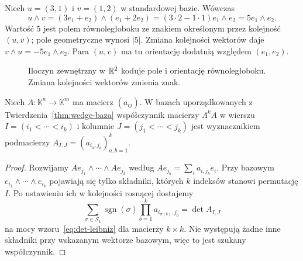\begin{przyklad}
Niech $u=(3,1)$ i $v=(1,2)$ w standardowej bazie.
Wówczas
\[
 u\wedge v=(3e_1+e_2)\wedge(e_1+2e_2)
 =(3\cdot2-1\cdot1)e_1\wedge e_2
 =5e_1\wedge e_2.
\]
Wartość $5$ jest polem równoległoboku ze znakiem określonym
przez kolejność $(u,v)$; pole geometryczne wynosi $|5|$.
Zmiana kolejności wektorów daje $v\wedge u=-5e_1\wedge e_2$.
Para $(u,v)$ ma tu orientację dodatnią względem $(e_1,e_2)$.
\end{przyklad}

\begin{figure}[H]
\centering
{}
\caption{Iloczyn zewnętrzny w $\mathbb{R}^2$ koduje pole i orientację
równoległoboku. Zmiana kolejności wektorów zmienia znak.}
\label{fig:wedge-pole}
\end{figure}

\begin{twierdzenie}
\label{thm:minory-lambda}
Niech $A\colon\mathbb K^n\to\mathbb K^m$ ma macierz
$(a_{ij})$. W bazach uporządkowanych z
Twierdzenia~\ref{thm:wedge-baza} współczynnik macierzy
$\Lambda^k A$ w wierszu $I=(i_1<\cdots<i_k)$ i kolumnie
$J=(j_1<\cdots<j_k)$ jest wyznacznikiem podmacierzy
$A_{I,J}=(a_{i_a,j_b})_{a,b=1}^k$.
\end{twierdzenie}
\begin{proof}
Rozwijamy
$Ae_{j_1}\wedge\cdots\wedge Ae_{j_k}$ według
$Ae_{j_b}=\sum_i a_{i,j_b}e_i$. Przy bazowym
$e_{i_1}\wedge\cdots\wedge e_{i_k}$ pojawiają się tylko
składniki, których $k$ indeksów stanowi permutację $I$.
Po ustawieniu ich w kolejności rosnącej dostajemy
\[
 \sum_{\sigma\in S_k}\operatorname{sgn}(\sigma)
 \prod_{b=1}^k a_{i_{\sigma(b)},j_b}
 =\det A_{I,J}
\]
na mocy wzoru~\eqref{eq:det-leibniz} dla macierzy $k\times k$.
Nie występują żadne inne składniki przy wskazanym
wektorze bazowym, więc to jest szukany współczynnik.
\end{proof}

